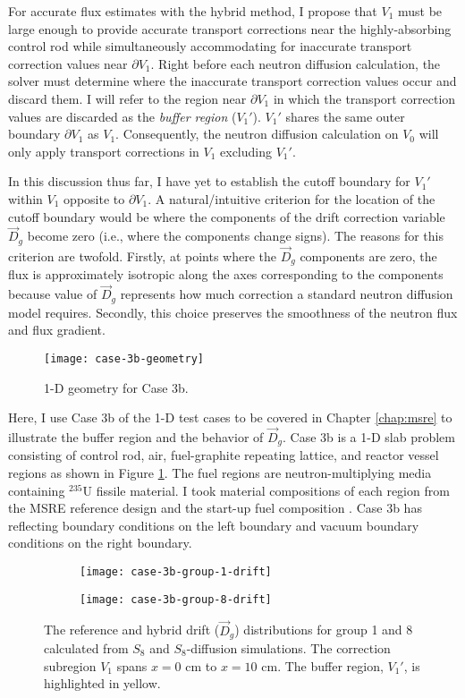 For accurate flux estimates with the hybrid method, I propose that $V_1$ must be large enough to
provide accurate transport corrections near the highly-absorbing control rod while simultaneously
accommodating for inaccurate transport correction values near $\partial V_1$. Right before each
neutron diffusion calculation, the solver must determine where the inaccurate transport correction
values occur and discard them. I will refer to the region near $\partial V_1$ in which the
transport correction values are discarded as the \textit{buffer region} ($V_1'$).
$V_1'$ shares the same outer boundary $\partial V_1$ as $V_1$. Consequently, the neutron
diffusion calculation on $V_0$ will only apply transport corrections in $V_1$ excluding $V_1'$.

In this discussion thus far, I have yet to establish the cutoff boundary for $V_1'$ within $V_1$
opposite to $\partial V_1$. A natural/intuitive criterion for the location of the cutoff boundary
would be where the components of the drift correction variable $\vec{D}_g$ become zero (i.e.,
where the components change signs). The reasons for this criterion are twofold. Firstly, at
points where the $\vec{D}_g$ components are zero, the flux is approximately isotropic along the
axes corresponding to the components because value of $\vec{D}_g$ represents how much correction a
standard neutron diffusion model requires. Secondly, this choice preserves the smoothness of the
neutron flux and flux gradient.
%
\begin{figure}[b]
	\centering
	\texttt{[image: case-3b-geometry]}
	\caption{1-D geometry for Case 3b.}
	\label{fig:3b-geometry}
\end{figure}

Here, I use Case 3b of the 1-D test cases to be covered in Chapter \ref{chap:msre}
to illustrate the buffer region and the behavior of $\vec{D}_g$. Case 3b is a 1-D slab problem
consisting of control rod, air, fuel-graphite repeating lattice, and reactor vessel regions as
shown in Figure \ref{fig:3b-geometry}. The fuel regions are neutron-multiplying media containing
$^\text{235}$U fissile material. I took material compositions of each region from the \gls{MSRE}
reference design and the start-up fuel composition \cite{fratoni_molten_2020}.
Case 3b has reflecting boundary conditions on the left boundary and vacuum boundary conditions on
the right boundary.
%
\begin{figure}[htb!]
    \centering
    \begin{subfigure}[t]{.49\textwidth}
        \centering
        \texttt{[image: case-3b-group-1-drift]}
    \end{subfigure}
    \hfill
    \begin{subfigure}[t]{.49\textwidth}
        \centering
        \texttt{[image: case-3b-group-8-drift]}
    \end{subfigure}
    \caption{The reference and hybrid drift ($\vec{D}_g$) distributions for group 1 and 8 calculated
      from $S_8$ and $S_8$-diffusion simulations. The correction subregion $V_1$ spans $x=0$ cm to
      $x=10$ cm. The buffer region, $V_1'$, is highlighted in yellow.}
    \label{fig:3b-drift-1}
\end{figure}

